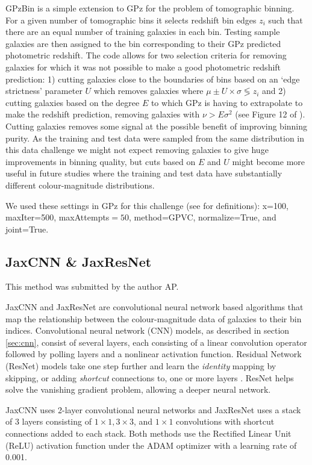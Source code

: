 \documentclass[twocolumn,twocolappendix]{aastex63}
\begin{document}
GPzBin is a simple extension to GPz for the problem of tomographic binning. For
a given number of tomographic bins it selects redshift bin edges $z_{i}$ such
that there are an equal number of training galaxies in each bin. Testing sample
galaxies are then assigned to the bin corresponding to their GPz predicted
photometric redshift. The code allows for two selection criteria for removing
galaxies for which it was not possible to make a good photometric redshift
prediction: 1) cutting galaxies close to the boundaries of bins based on an
`edge strictness' parameter $U$ which removes galaxies where $\mu\pm U \times
\sigma \lessgtr z_i$ and 2) cutting galaxies based on the degree $E$ to which
GPz is having to extrapolate to make the redshift prediction, removing galaxies
with $\nu>E\sigma^2$ (see Figure 12 of \citealp{Hatfield2020}). Cutting galaxies
removes some signal at the possible benefit of improving binning purity. As the
training and test data were sampled from the same distribution in this data
challenge we might not expect removing galaxies to give huge improvements in
binning quality, but cuts based on $E$ and $U$ might become more useful in
future studies where the training and test data have substantially different
colour-magnitude distributions.

We used these settings in GPz for this challenge (see
\citealp{Almosallam2016a,Almosallam2016b} for definitions): x=100, maxIter=500, 
maxAttempts$=50$, method=GPVC, normalize=True, and joint=True.


\subsection{{\sc JaxCNN \& JaxResNet} }
 
This method was submitted by the author AP.
 
JaxCNN and JaxResNet are convolutional neural network based algorithms that
map the relationship between the colour-magnitude data of galaxies to their bin
indices. Convolutional neural network (CNN) models, as described in section
\ref{sec:cnn}, consist of several layers, each consisting of a linear
convolution operator followed by polling layers and a nonlinear activation
function. Residual Network (ResNet) models take one step further and learn the
\textit{identity} mapping by skipping, or adding \textit{shortcut} connections
to, one or more layers \citep{resnet}. ResNet helps solve the vanishing gradient
problem, allowing a deeper neural network.
 
JaxCNN uses 2-layer convolutional neural networks and JaxResNet uses a stack of
3 layers consisting of $1 \times 1, 3 \times 3$, and $1 \times 1$ convolutions
with shortcut connections added to each stack. Both methods use the Rectified
Linear Unit (ReLU) activation function under the ADAM optimizer \cite{adam} with
a learning rate of 0.001. 
 
\end{document}
